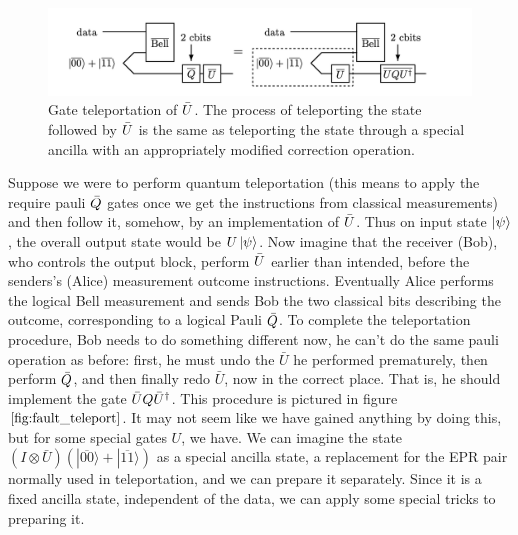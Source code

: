 \begin{figure}[h!]
    \centering
    \includegraphics[width=\textwidth]{Mainmatter/images/teleportation_fault.png}
    \caption{Gate teleportation of $\Bar{U}$. The process of teleporting the state followed by $\Bar{U}$ is the same as teleporting the state through a special ancilla with an appropriately modified correction operation.}
    \label{fig:fault_teleport}
\end{figure}
Suppose we were to perform quantum teleportation (this means to apply the require pauli $\Bar{Q}$ gates once we get the instructions from classical measurements) and then follow it, somehow, by an implementation of $\Bar{U}$. Thus on input state $\ket{\psi}$, the overall output state would be $U\ket{\psi}$. 
Now imagine that the receiver (Bob), who controls the output block, perform $\Bar{U}$ earlier than intended, before the senders’s (Alice) measurement outcome instructions.
Eventually Alice performs the logical Bell measurement and sends Bob the two classical bits describing the outcome, corresponding to a logical Pauli $\Bar{Q}$.
To complete the teleportation procedure, Bob needs to do something different now, he can't do the same pauli operation as before: first, he must undo the $\bar{U}$ he performed prematurely, then perform $\Bar{Q}$, and then finally redo $\bar{U}$, now in the correct place. That is, he should implement the gate $\Bar{U}Q\Bar{U}^{\dagger}$. This procedure is pictured in figure $\ref{fig:fault_teleport}$. It may not seem like we have gained anything by doing this, but for some special gates $U$, we have. We can imagine the state $(I \otimes \bar{U})(|\overline{00}\rangle+|\overline{11}\rangle)$ as a special ancilla state, a replacement for the EPR pair normally used in teleportation, and we can prepare it separately. Since it is a fixed ancilla state, independent of the data, we can apply some special tricks to preparing it.

